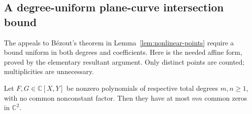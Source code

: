 \subsection{A degree-uniform plane-curve intersection bound}

The appeals to B\'ezout's theorem in Lemma~\ref{lem:nonlinear-points}
require a bound uniform in both degrees and coefficients.  Here is the
needed affine form, proved by the elementary resultant argument.
Only distinct points are counted; multiplicities are unnecessary.

\begin{lemma}\label{lem:elementary-bezout}
Let $F,G\in\mathbb C[X,Y]$ be nonzero polynomials of respective total
degrees $m,n\ge1$, with no common nonconstant factor.  Then they have
at most $mn$ common zeros in $\mathbb C^2$.
\end{lemma}


